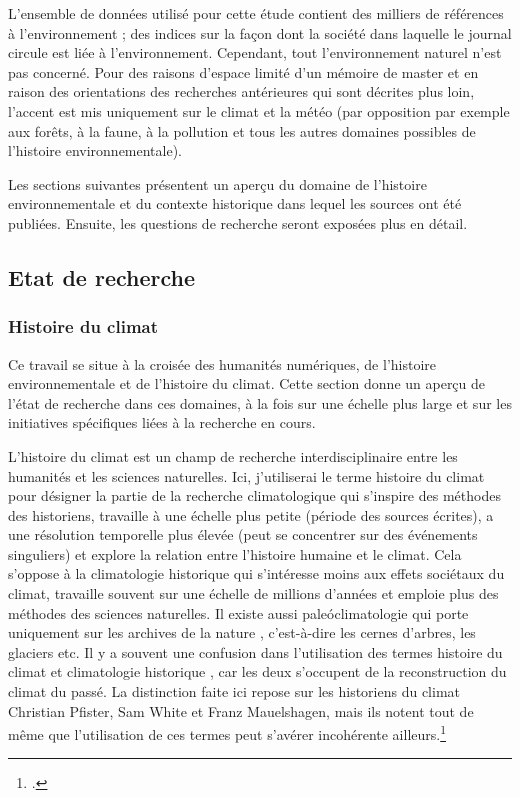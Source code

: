 \documentclass[a4paper,twoside,12pt]{article}
\begin{document}
L'ensemble de données utilisé pour cette étude contient des milliers de références à l'environnement ; des indices sur la façon dont la société dans laquelle le journal circule est liée à l'environnement. Cependant, tout l'environnement naturel n'est pas concerné. Pour des raisons d'espace limité d'un mémoire de master et en raison des orientations des recherches antérieures qui sont décrites plus loin, l'accent est mis uniquement sur le climat et la météo (par opposition par exemple aux forêts, à la faune, à la pollution et tous les autres domaines possibles de l'histoire environnementale).

Les sections suivantes présentent un aperçu du domaine de l'histoire environnementale et du contexte historique dans lequel les sources ont été publiées. Ensuite, les questions de recherche seront exposées plus en détail.


\subsection*{Etat de recherche}

\subsubsection*{Histoire du climat}

Ce travail se situe à la croisée des humanités numériques, de l'histoire environnementale et de l'histoire du climat. Cette section donne un aperçu de l'état de recherche dans ces domaines, à la fois sur une échelle plus large et sur les initiatives spécifiques liées à la recherche en cours.

L'histoire du climat est un champ de recherche interdisciplinaire entre les humanités et les sciences naturelles. Ici, j'utiliserai le terme \og histoire du climat \fg{} pour désigner la partie de la recherche climatologique qui s'inspire des méthodes des historiens, travaille à une échelle plus petite (période des sources écrites), a une résolution temporelle plus élevée (peut se concentrer sur des événements singuliers) et explore la relation entre l'histoire humaine et le climat. Cela s'oppose à la \og climatologie historique \fg{} qui s'intéresse moins aux effets sociétaux du climat, travaille souvent sur une échelle de millions d'années et emploie plus des méthodes des sciences naturelles. Il existe aussi \og paleóclimatologie \fg{} qui porte uniquement sur les \og archives de la nature \fg{}, c'est-à-dire les cernes d'arbres, les glaciers etc. Il y a souvent une confusion dans l'utilisation des termes \og histoire du climat \fg{} et \og climatologie historique \fg{}, car les deux s'occupent de la reconstruction du climat du passé. La distinction faite ici repose sur les historiens du climat Christian Pfister, Sam White et Franz Mauelshagen, mais ils notent tout de même que l'utilisation de ces termes peut s'avérer incohérente ailleurs.\footcite[][1-3]{white_palgrave_2018}
\end{document}
